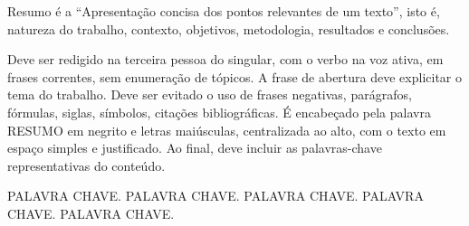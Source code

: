 
\resumo

Resumo é a “Apresentação concisa dos pontos relevantes de um texto”, isto é, natureza do trabalho, contexto, objetivos, metodologia, resultados e conclusões.

Deve ser redigido na terceira pessoa do singular, com o verbo na voz ativa, em frases correntes, sem enumeração de tópicos. A frase de abertura deve explicitar o tema do trabalho. Deve ser evitado o uso de frases negativas, parágrafos, fórmulas, siglas, símbolos, citações bibliográficas. É encabeçado pela palavra RESUMO em negrito e letras maiúsculas, centralizada ao alto, com o texto em espaço simples e justificado. Ao final, deve incluir as palavras-chave representativas do conteúdo.

\begin{keywords}
 PALAVRA CHAVE. PALAVRA CHAVE. PALAVRA CHAVE. PALAVRA CHAVE. PALAVRA CHAVE.
\end{keywords}